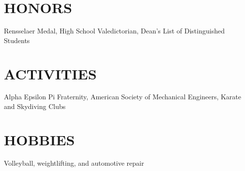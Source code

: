 \begin{resume}
\section{HONORS} 
 
Rensselaer  Medal,  High  School  Valedictorian,  Dean's  List of 
Distinguished Students 
 
\section{ACTIVITIES} 
 
Alpha Epsilon  Pi  Fraternity,  American  Society  of  Mechanical 
Engineers, Karate and Skydiving Clubs 
 
\section{HOBBIES} 
 
Volleyball, weightlifting, and automotive repair 
 

\end{resume}












